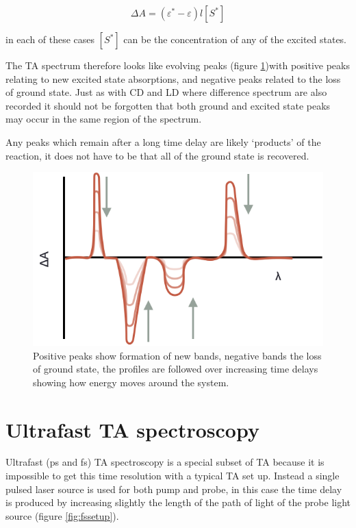\documentclass[
]{book}
\begin{document}
\begin{equation}
\Delta A = (\varepsilon ^* - \varepsilon) l [S^*]
\label{eq:TA}
\end{equation}

in each of these cases \([S^*]\) can be the concentration of any of the excited states.

The TA spectrum therefore looks like evolving peaks (figure \ref{fig:TAevolution})with positive peaks relating to new excited state absorptions, and negative peaks related to the loss of ground state. Just as with CD and LD where difference spectrum are also recorded it should not be forgotten that both ground and excited state peaks may occur in the same region of the spectrum.

Any peaks which remain after a long time delay are likely `products' of the reaction, it does not have to be that all of the ground state is recovered.

\begin{figure}

{\centering \includegraphics[width=0.6\linewidth]{images/TAevolution} 

}

\caption{Positive peaks show formation of new bands, negative bands the loss of ground state, the profiles are followed over increasing time delays showing how energy moves around the system.}\label{fig:TAevolution}
\end{figure}

\hypertarget{ultrafast-ta-spectroscopy}{%
\section{Ultrafast TA spectroscopy}\label{ultrafast-ta-spectroscopy}}

Ultrafast (ps and fs) TA spectroscopy is a special subset of TA because it is impossible to get this time resolution with a typical TA set up. Instead a single pulsed laser source is used for both pump and probe, in this case the time delay is produced by increasing slightly the length of the path of light of the probe light source (figure \ref{fig:fssetup}).
\end{document}
